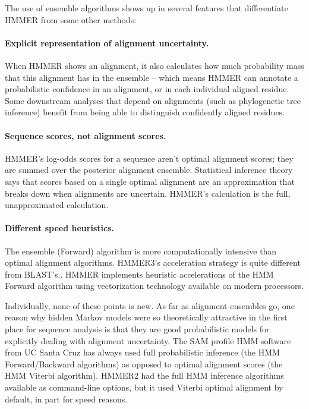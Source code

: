 The use of ensemble algorithms shows up in several features that
differentiate HMMER from some other methods:

\paragraph{Explicit representation of alignment uncertainty.}
  When HMMER shows an alignment, it also calculates how much
  probability mass that this alignment has in the ensemble -- which
  means HMMER can annotate a probabilistic confidence in an alignment,
  or in each individual aligned residue. Some downstream analyses that
  depend on alignments (such as phylogenetic tree inference) benefit
  from being able to distinguish confidently aligned residues.

\paragraph{Sequence scores, not alignment scores.} HMMER's
  log-odds scores for a sequence aren't optimal alignment scores; they
  are summed over the posterior alignment ensemble. Statistical
  inference theory says that scores based on a single optimal
  alignment are an approximation that breaks down when alignments are
  uncertain. HMMER's calculation is the full, unapproximated
  calculation.
 
\paragraph{Different speed heuristics.} The ensemble (Forward) algorithm is more
  computationally intensive than optimal alignment algorithms.
  HMMER3's acceleration strategy is quite different from
  BLAST's.\cite{Eddy11}.  HMMER implements heuristic accelerations of
  the HMM Forward algorithm using vectorization technology available
  on modern processors.\vspace{1em}

Individually, none of these points is new. As far as alignment
ensembles go, one reason why hidden Markov models were so
theoretically attractive in the first place for sequence analysis is
that they are good probabilistic models for explicitly dealing with
alignment uncertainty. The SAM profile HMM software from UC Santa Cruz
has always used full probabilistic inference (the HMM Forward/Backward
algorithms) as opposed to optimal alignment scores (the HMM Viterbi
algorithm). HMMER2 had the full HMM inference algorithms available as
command-line options, but it used Viterbi optimal alignment by
default, in part for speed reasons.

